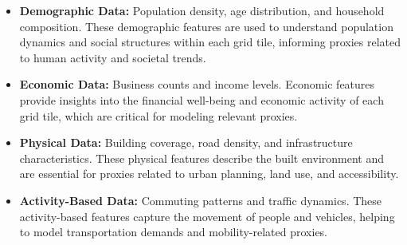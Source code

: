 \documentclass[conference]{IEEEtran}
\begin{document}
\begin{itemize}
\item \textbf{Demographic Data:} Population density, age distribution, and household composition. These demographic features are used to understand population dynamics and social structures within each grid tile, informing proxies related to human activity and societal trends.

\item \textbf{Economic Data:} Business counts and income levels. Economic features provide insights into the financial well-being and economic activity of each grid tile, which are critical for modeling relevant proxies.

\item \textbf{Physical Data:} Building coverage, road density, and infrastructure characteristics. These physical features describe the built environment and are essential for proxies related to urban planning, land use, and accessibility.

\item \textbf{Activity-Based Data:} Commuting patterns and traffic dynamics. These activity-based features capture the movement of people and vehicles, helping to model transportation demands and mobility-related proxies.
\end{itemize}




\end{document}
